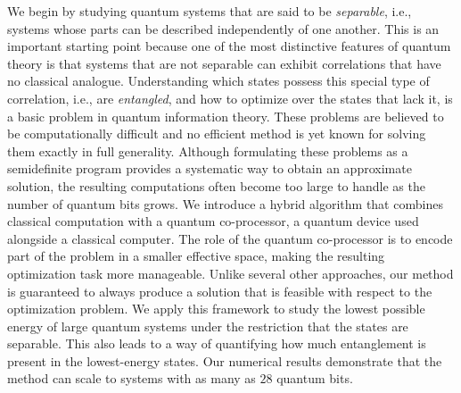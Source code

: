We begin by studying quantum systems that are said to be \emph{separable}, i.e., systems whose parts can be described independently of one another. 
This is an important starting point because one of the most distinctive features of quantum theory is that systems that are not separable can exhibit correlations that have no classical analogue. 
Understanding which states possess this special type of correlation, i.e., are \emph{entangled}, and how to optimize over the states that lack it, is a basic problem in quantum information theory.
%
These problems are believed to be computationally difficult and no efficient method is yet known for solving them exactly in full generality. 
Although formulating these problems as a semidefinite program provides a systematic way to obtain an approximate solution, the resulting computations often become too large to handle as the number of quantum bits grows.
%
We introduce a hybrid algorithm that combines classical computation with a quantum co-processor, a quantum device used alongside a classical computer. 
The role of the quantum co-processor is to encode part of the problem in a smaller effective space, making the resulting optimization task more manageable.
%
Unlike several other approaches, our method is guaranteed to always produce a solution that is feasible with respect to the optimization problem.
%
We apply this framework to study the lowest possible energy of large quantum systems under the restriction that the states are separable. 
This also leads to a way of quantifying how much entanglement is present in the lowest-energy states. 
Our numerical results demonstrate that the method can scale to systems with as many as $28$ quantum bits.


